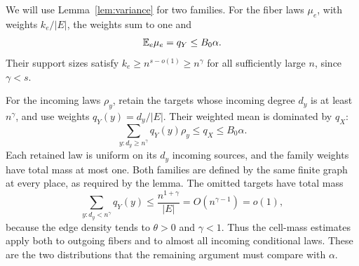 We will use Lemma~\ref{lem:variance} for two families.  For the fiber
laws $\mu_e$, with weights $k_e/|E|$, the weights sum to one and
\[
 \mathbb E_e\mu_e=q_Y\le B_0\alpha.
\]
Their support sizes satisfy $k_e\ge n^{s-o(1)}\ge n^\gamma$ for all
sufficiently large $n$, since $\gamma<s$.

For the incoming laws $\rho_y$, retain the targets whose incoming
degree $d_y$ is at least $n^\gamma$, and use weights
$q_Y(y)=d_y/|E|$.  Their weighted mean is dominated by $q_X$:
\[
 \sum_{y:d_y\ge n^\gamma}q_Y(y)\rho_y\le q_X\le B_0\alpha.
\]
Each retained law is uniform on its $d_y$ incoming sources, and the
family weights have total mass at most one.  Both families are defined
by the same finite graph at every place, as required by the lemma.
The omitted targets have total mass
\begin{equation}\label{eq:variance-omitted}
 \sum_{y:d_y<n^\gamma}q_Y(y)
 \le\frac{n^{1+\gamma}}{|E|}
 =O(n^{\gamma-1})=o(1),
\end{equation}
because the edge density tends to $\theta>0$ and $\gamma<1$.
Thus the cell-mass estimates apply both to outgoing fibers and to
almost all incoming conditional laws.  These are the two distributions
that the remaining argument must compare with $\alpha$.
